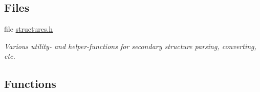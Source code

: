 \subsection*{Files}
\begin{DoxyCompactItemize}
\item 
file \hyperlink{utils_2structures_8h}{structures.\+h}
\begin{DoxyCompactList}\small\item\em Various utility-\/ and helper-\/functions for secondary structure parsing, converting, etc. \end{DoxyCompactList}\end{DoxyCompactItemize}
\subsection*{Functions}
